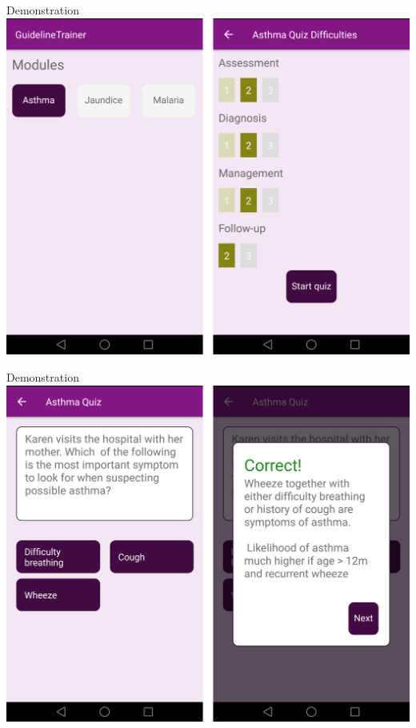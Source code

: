 \documentclass{beamer}
\begin{document}
\begin{frame}{Demonstration}
\includegraphics[scale=0.16]{Montage1}
\end{frame}
\begin{frame}{Demonstration}
\includegraphics[scale=0.16]{Montage2}
\end{frame}
\end{document}
